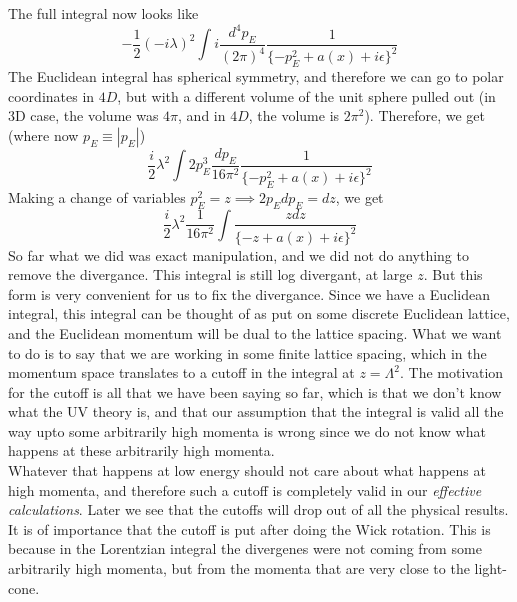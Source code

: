 \documentclass[11pt, notitlepage]{report}
\numberwithin{equation}{section}
\begin{document}
The full integral now looks like 
\begin{equation*}
    -\frac{1}{2}(-i\lambda)^2  \int i\frac{d^4p_{E}}{(2\pi)^4} \frac{1}{\{-p_E^2 + a(x) + i\epsilon\}^2}
\end{equation*}
The Euclidean integral has spherical symmetry, and therefore we can go to polar coordinates in \(4D\), but with a different volume of the unit sphere pulled out (in 3D case, the volume was \(4\pi\), and in \(4D\), the volume is \(2\pi^2\)). Therefore, we get (where now \(p_E\equiv |p_E|\))
\begin{equation*}
    \frac{i}{2}\lambda^2  \int 2 p_E^3 \frac{dp_{E}}{16 \pi^2} \frac{1}{\{-p_E^2 + a(x) + i\epsilon\}^2}
\end{equation*}
Making a change of variables \(p_E^2 = z \implies 2p_Edp_E = dz\), we get 
\begin{equation*}
    \frac{i}{2}\lambda^2  \frac{1}{16\pi^2}\int  \frac{z dz}{\{-z + a(x) + i\epsilon\}^2}
\end{equation*}
So far what we did was exact manipulation, and we did not do anything to remove the divergance. This integral is still log divergant, at large \(z\). But this form is very convenient for us to fix the divergance. Since we have a Euclidean integral, this integral can be thought of as put on some discrete Euclidean lattice, and the Euclidean momentum will be dual to the lattice spacing. What we want to do is to say that we are working in some finite lattice spacing, which in the momentum space translates to a cutoff in the integral at \(z = \Lambda^2\). The motivation for the cutoff is all that we have been saying so far, which is that we don't know what the UV theory is, and that our assumption that the integral is valid all the way upto some arbitrarily high momenta is wrong since we do not know what happens at these arbitrarily high momenta. \\
Whatever that happens at low energy should not care about what happens at high momenta, and therefore such a cutoff is completely valid in our \textit{effective calculations}. Later we see that the cutoffs will drop out of all the physical results. \\

It is of importance that the cutoff is put after doing the Wick rotation. This is because in the Lorentzian integral the divergenes were not coming from some arbitrarily high momenta, but from the momenta that are very close to the light-cone. \\
\end{document}
